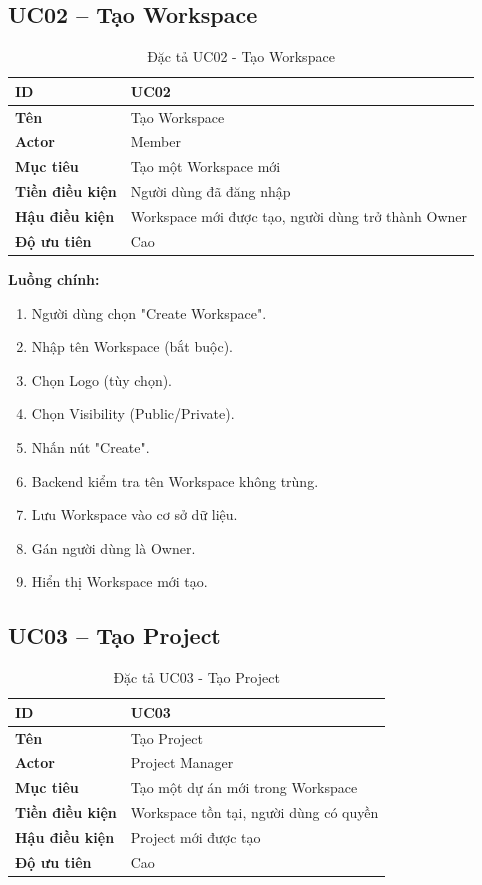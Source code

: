 \documentclass[12pt,a4paper]{report}
\begin{document}
\subsection{UC02 -- Tạo Workspace}

\begin{table}[H]
\centering
\caption{Đặc tả UC02 - Tạo Workspace}
\begin{tabular}{|p{4cm}|p{11cm}|}
\hline
\textbf{ID} & UC02 \\
\hline
\textbf{Tên} & Tạo Workspace \\
\hline
\textbf{Actor} & Member \\
\hline
\textbf{Mục tiêu} & Tạo một Workspace mới \\
\hline
\textbf{Tiền điều kiện} & Người dùng đã đăng nhập \\
\hline
\textbf{Hậu điều kiện} & Workspace mới được tạo, người dùng trở thành Owner \\
\hline
\textbf{Độ ưu tiên} & Cao \\
\hline
\end{tabular}
\end{table}

\textbf{Luồng chính:}

\begin{enumerate}
\item Người dùng chọn "Create Workspace".
\item Nhập tên Workspace (bắt buộc).
\item Chọn Logo (tùy chọn).
\item Chọn Visibility (Public/Private).
\item Nhấn nút "Create".
\item Backend kiểm tra tên Workspace không trùng.
\item Lưu Workspace vào cơ sở dữ liệu.
\item Gán người dùng là Owner.
\item Hiển thị Workspace mới tạo.
\end{enumerate}

\subsection{UC03 -- Tạo Project}

\begin{table}[H]
\centering
\caption{Đặc tả UC03 - Tạo Project}
\begin{tabular}{|p{4cm}|p{11cm}|}
\hline
\textbf{ID} & UC03 \\
\hline
\textbf{Tên} & Tạo Project \\
\hline
\textbf{Actor} & Project Manager \\
\hline
\textbf{Mục tiêu} & Tạo một dự án mới trong Workspace \\
\hline
\textbf{Tiền điều kiện} & Workspace tồn tại, người dùng có quyền \\
\hline
\textbf{Hậu điều kiện} & Project mới được tạo \\
\hline
\textbf{Độ ưu tiên} & Cao \\
\hline
\end{tabular}
\end{table}
\end{document}

